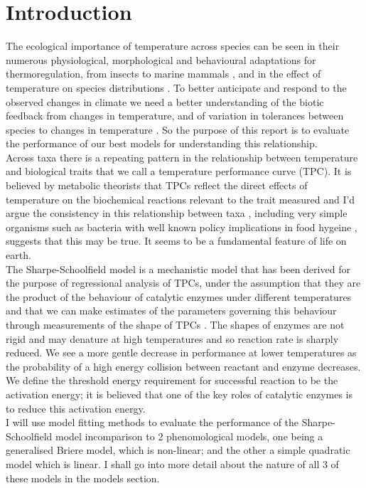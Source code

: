 \documentclass[fontsize=11pt]{scrartcl}\usepackage[]{graphicx}\usepackage[]{color}
\begin{document}
  \section{Introduction} 
  The ecological importance of temperature across species can be seen in their numerous physiological, morphological and 
  behavioural adaptations for thermoregulation, from insects to marine mammals \cite{Castellini2018,Heinrich2009}, and in the effect of temperature
  on species distributions \cite{Woodward1988,Buckley}. To better anticipate and respond to the observed changes in climate \cite{RoyalSociety}
  we need a better understanding of the biotic feedback from changes in temperature, and of variation
  in tolerances between species to changes in temperature \cite{Buckley}. So the purpose of this report is to evaluate the performance of our best models
  for understanding this relationship.\\
  Across taxa there is a repeating pattern in the relationship between temperature and biological traits that we call a temperature performance curve (TPC). 
  It is believed by metabolic theorists that TPCs reflect the direct effects 
  of temperature on the biochemical reactions relevant to the trait measured and I'd argue the consistency in this relationship between taxa \cite{Dell2011a}, including 
  very simple organisms such as bacteria with well known policy implications in food hygeine \cite{Zwietering1991b}, suggests that this may be true. 
  It seems to be a fundamental feature of life on earth. \\
  The Sharpe-Schoolfield model is a mechanistic model that has been derived for the purpose of regressional 
  analysis of TPCs, under the assumption that they are the product of the behaviour of catalytic enzymes under different temperatures and that we can make 
  estimates of the parameters governing this behaviour through measurements of the shape of TPCs \cite{Schoolfield1981}. The shapes of enzymes are not 
  rigid and may denature at high temperatures and so reaction rate is sharply reduced. We see a more gentle decrease in performance at lower temperatures as the probability of a high energy collision 
  between reactant and enzyme decreases. We define the threshold energy requirement for successful reaction to be the activation energy; it is believed that
  one of the key roles of catalytic enzymes is to reduce this activation energy. \\ 
  I will use model fitting methods to evaluate the performance of the Sharpe-Schoolfield model incomparison to 2 phenomological models, one being a 
  generalised Briere model, which is non-linear; 
  and the other a simple quadratic model which is linear. I shall go into more detail about the nature of all 3 of these models in the models section. \\
\end{document}
